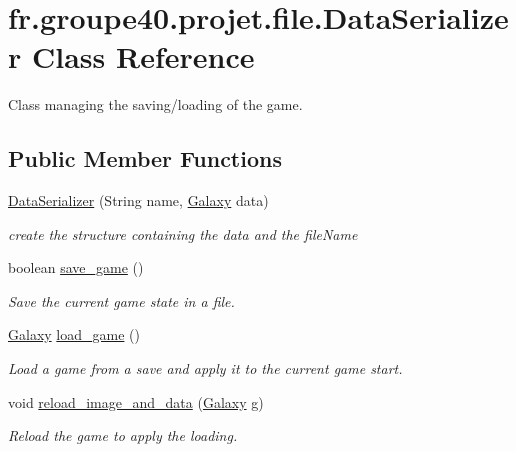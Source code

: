 \hypertarget{classfr_1_1groupe40_1_1projet_1_1file_1_1_data_serializer}{}\section{fr.\+groupe40.\+projet.\+file.\+Data\+Serializer Class Reference}
\label{classfr_1_1groupe40_1_1projet_1_1file_1_1_data_serializer}


Class managing the saving/loading of the game.  


\subsection*{Public Member Functions}
\begin{DoxyCompactItemize}
\item 
\hyperlink{classfr_1_1groupe40_1_1projet_1_1file_1_1_data_serializer_a6424f3371fa177b49444b47882ddc776}{Data\+Serializer} (String name, \hyperlink{classfr_1_1groupe40_1_1projet_1_1model_1_1board_1_1_galaxy}{Galaxy} data)
\begin{DoxyCompactList}\small\item\em create the structure containing the data and the file\+Name \end{DoxyCompactList}\item 
boolean \hyperlink{classfr_1_1groupe40_1_1projet_1_1file_1_1_data_serializer_a007629e3f94601342175120cd37b9f2a}{save\+\_\+game} ()
\begin{DoxyCompactList}\small\item\em Save the current game state in a file. \end{DoxyCompactList}\item 
\hyperlink{classfr_1_1groupe40_1_1projet_1_1model_1_1board_1_1_galaxy}{Galaxy} \hyperlink{classfr_1_1groupe40_1_1projet_1_1file_1_1_data_serializer_aee21aaad042ebf0a5e6eb43f2844cecc}{load\+\_\+game} ()
\begin{DoxyCompactList}\small\item\em Load a game from a save and apply it to the current game start. \end{DoxyCompactList}\item 
void \hyperlink{classfr_1_1groupe40_1_1projet_1_1file_1_1_data_serializer_a777ad420962d628b445d6012a5cfffb2}{reload\+\_\+image\+\_\+and\+\_\+data} (\hyperlink{classfr_1_1groupe40_1_1projet_1_1model_1_1board_1_1_galaxy}{Galaxy} g)
\begin{DoxyCompactList}\small\item\em Reload the game to apply the loading. \end{DoxyCompactList}\end{DoxyCompactItemize}


